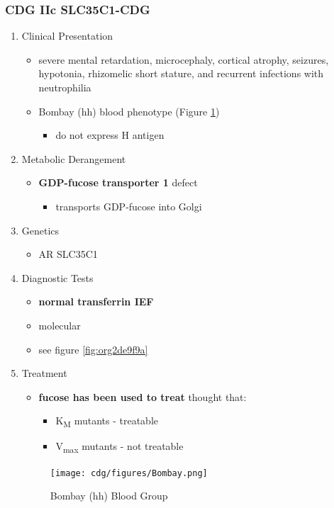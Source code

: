 \documentclass[12pt]{scrartcl}
\begin{document}
\subsubsection{CDG IIc SLC35C1-CDG}
\label{sec:org518d69b}
\begin{enumerate}
\item Clinical Presentation
\label{sec:org1cfab4b}
\begin{itemize}
\item severe mental retardation, microcephaly, cortical atrophy, seizures,
hypotonia, rhizomelic short stature, and recurrent infections with
neutrophilia
\item Bombay (hh) blood phenotype (Figure \ref{fig:org25c2c9e})
\begin{itemize}
\item do not express H antigen
\end{itemize}
\end{itemize}
\item Metabolic Derangement
\label{sec:org19d678c}
\begin{itemize}
\item \textbf{GDP-fucose transporter 1} defect
\begin{itemize}
\item transports GDP-fucose into Golgi
\end{itemize}
\end{itemize}
\item Genetics
\label{sec:orgb3e8d50}
\begin{itemize}
\item AR SLC35C1
\end{itemize}

\item Diagnostic Tests
\label{sec:org1df1138}
\begin{itemize}
\item \textbf{normal transferrin IEF}
\item molecular
\item see figure \ref{fig:org2de9f9a}
\end{itemize}
\item Treatment
\label{sec:org4a0e581}
\begin{itemize}
\item \textbf{fucose has been used to treat} thought that:
\begin{itemize}
\item K\textsubscript{M} mutants - treatable
\item V\textsubscript{max} mutants - not treatable
\end{itemize}
\end{itemize}

\begin{figure}[htbp]
\centering
\texttt{[image: cdg/figures/Bombay.png]}
\caption[Hh]{\label{fig:org25c2c9e}Bombay (hh) Blood Group}
\end{figure}
\end{enumerate}
\end{document}
